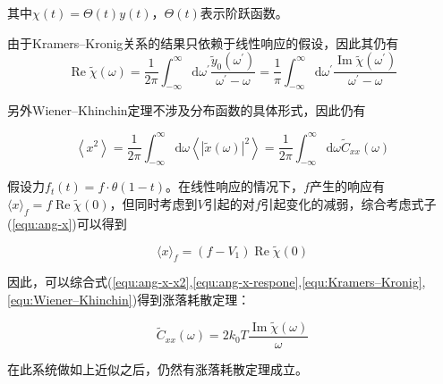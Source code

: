 其中$\chi(t)=\Theta(t) y(t)$，$\Theta(t)$表示阶跃函数。

由于Kramers–Kronig关系\cite{kramersDiffusionLumierePar1927,kronigTheoryDispersionXrays1926}的结果只依赖于线性响应的假设，因此其仍有
\begin{equation}
    \operatorname{Re} \tilde{\chi}(\omega)=\frac{1}{2 \pi} \int_{-\infty}^{\infty} \mathrm{d} \omega^{\prime} \frac{\tilde{y}_{0}\left(\omega^{\prime}\right)}{\omega^{\prime}-\omega}=\frac{1}{\pi} \int_{-\infty}^{\infty} \mathrm{d} \omega^{\prime} \frac{\operatorname{Im} \tilde{\chi}\left(\omega^{\prime}\right)}{\omega^{\prime}-\omega}
    \label{equ:Kramers–Kronig}
\end{equation}

另外Wiener–Khinchin定理\cite{wienerGeneralizedHarmonicAnalysis1930}不涉及分布函数的具体形式，因此仍有

\begin{equation}
    \left\langle x^{2}\right\rangle=\frac{1}{2 \pi} \int_{-\infty}^{\infty} \mathrm{d} \omega\left\langle|\tilde{x}(\omega)|^{2}\right\rangle=\frac{1}{2 \pi} \int_{-\infty}^{\infty} \mathrm{d} \omega \tilde{C}_{x x}(\omega)
    \label{equ:Wiener–Khinchin}
\end{equation}

假设力$f_t(t) = f\cdot\theta(1-t)$。在线性响应的情况下，$f$产生的响应有$\langle x\rangle_{f}=f \operatorname{Re} \tilde{\chi}(0)$，但同时考虑到$V$引起的对$f$引起变化的减弱，综合考虑式子(\ref{equ:ang-x})可以得到

\begin{equation}
    \langle x\rangle_{f}=(f-V_1) \operatorname{Re} \tilde{\chi}(0)
    \label{equ:ang-x-respone}
\end{equation}

因此，可以综合式(\ref{equ:ang-x-x2},\ref{equ:ang-x-respone},\ref{equ:Kramers–Kronig},\ref{equ:Wiener–Khinchin})得到涨落耗散定理：

\begin{equation}
    \tilde{C}_{x x}(\omega)=2 k_{0} T \frac{\operatorname{Im} \tilde{\chi}(\omega)}{\omega}
\end{equation}

在此系统做如上近似之后，仍然有涨落耗散定理成立。